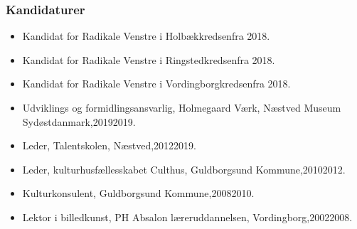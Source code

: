 \documentclass[11pt, a4paper]{awesome-cv}
\begin{document}
\begin{cvletter}
\subsubsection*{Kandidaturer}
\begin{itemize}
\item Kandidat for Radikale Venstre i Holbækkredsenfra 2018.
\item Kandidat for Radikale Venstre i Ringstedkredsenfra 2018.
\item Kandidat for Radikale Venstre i Vordingborgkredsenfra 2018.
\end{itemize}
\begin{itemize}
\item Udviklings og formidlingsansvarlig, Holmegaard Værk, Næstved Museum Sydøstdanmark,20192019.
\item Leder, Talentskolen, Næstved,20122019.
\item Leder, kulturhusfællesskabet Culthus, Guldborgsund Kommune,20102012.
\item Kulturkonsulent, Guldborgsund Kommune,20082010.
\item Lektor i billedkunst, PH Absalon læreruddannelsen, Vordingborg,20022008.
\end{itemize}
\end{cvletter}
\end{document}
